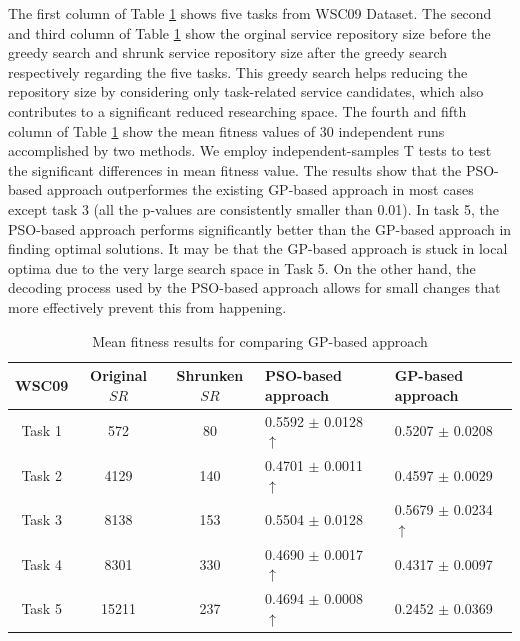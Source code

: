 \documentclass{llncs}
\begin{document}
The first column of Table \ref{meanFitness} shows five tasks from WSC09 Dataset. The second and third column of Table \ref{meanFitness} show the orginal service repository size before the greedy search and shrunk service repository size after the greedy search respectively regarding the five tasks. This greedy search helps reducing the repository size by considering only task-related service candidates, which also contributes to a significant reduced researching space. The fourth and fifth column of Table \ref{meanFitness} show the mean fitness values of 30 independent runs accomplished by two methods. We employ independent-samples T tests to test the significant differences in mean fitness value. The results show that the PSO-based approach outperformes the existing GP-based approach in most cases except task 3 (all the p-values are consistently smaller than 0.01). In task 5, the PSO-based approach performs significantly better than the GP-based approach in finding optimal solutions. It may be that the GP-based approach is stuck in local optima due to the very large search space in Task 5. On the other hand, the decoding process used by the PSO-based approach allows for small changes that more effectively prevent this from happening.
\begin{table}[]
\centering
\caption{Mean fitness results for comparing GP-based approach}
\label{meanFitness}
\begin{tabular}{c|c|c|l|l}
\hline
\multicolumn{1}{c|}{WSC09} &Original $SR$  &Shrunken $SR$   &PSO-based approach & GP-based approach  \\ \hline
Task 1                     &572            &80    &0.5592 $\pm$ 0.0128  $\uparrow$  &0.5207 $\pm$ 0.0208           \\ \hline
Task 2                     &4129           &140   &0.4701 $\pm$ 0.0011  $\uparrow$  &0.4597 $\pm$ 0.0029          \\ \hline
Task 3                     &8138           &153   &0.5504 $\pm$ 0.0128              &0.5679 $\pm$ 0.0234 $\uparrow$   \\ \hline
Task 4                     &8301           &330   &0.4690 $\pm$ 0.0017  $\uparrow$  &0.4317 $\pm$ 0.0097            \\ \hline
Task 5                     &15211          &237   &0.4694 $\pm$ 0.0008  $\uparrow$  &0.2452 $\pm$ 0.0369            \\ \hline
\end{tabular}
\end{table}
\end{document}
